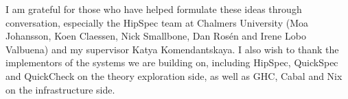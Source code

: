 \documentclass{eceasst}
\begin{document}
\begin{acknowledge}
I am grateful for those who have helped formulate these ideas through
conversation, especially the HipSpec team at Chalmers University (Moa
Johansson, Koen Claessen, Nick Smallbone, Dan Rosén and Irene Lobo Valbuena)
and my supervisor Katya Komendantskaya. I also wish to thank the implementors
of the systems we are building on, including HipSpec, QuickSpec and
QuickCheck on the theory exploration side, as well as GHC, Cabal and Nix
on the infrastructure side.
\end{acknowledge}



\end{document}

